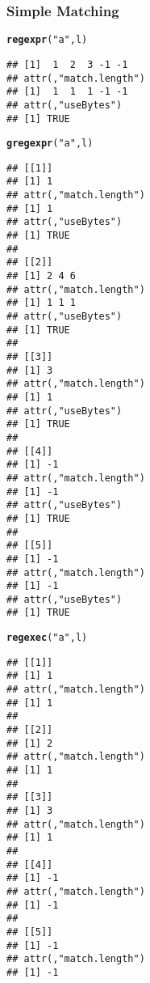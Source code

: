 \documentclass[paper=screen,mathserif]{beamer}\usepackage[]{graphicx}\usepackage[]{color}
\makeatletter
\newcommand{\hlstr}[1]{\textcolor[rgb]{0.192,0.494,0.8}{#1}}%
\newcommand{\hlstd}[1]{\textcolor[rgb]{0.345,0.345,0.345}{#1}}%
\newcommand{\hlkwd}[1]{\textcolor[rgb]{0.737,0.353,0.396}{\textbf{#1}}}%
\newenvironment{kframe}{%
 \def\at@end@of@kframe{}%
 \ifinner\ifhmode%
  \def\at@end@of@kframe{\end{minipage}}%
  \begin{minipage}{\columnwidth}%
 \fi\fi%
 \def\FrameCommand##1{\hskip\@totalleftmargin \hskip-\fboxsep
 \colorbox{shadecolor}{##1}\hskip-\fboxsep
     \hskip-\linewidth \hskip-\@totalleftmargin \hskip\columnwidth}%
 \MakeFramed {\advance\hsize-\width
   \@totalleftmargin\z@ \linewidth\hsize
   \@setminipage}}%
 {\par\unskip\endMakeFramed%
 \at@end@of@kframe}
\newenvironment{knitrout}{}{} %
\newcommand{\ft}[1]{\frametitle{#1}}
\newenvironment{xframe}[1][]
{\begin{frame}[fragile,environment=xframe]
    \frametitle{#1}}
  {\end{frame}}
\makeatother
\begin{document}
\begin{xframe}
  \ft{Simple Matching}

\begin{knitrout}\tiny
{}\color{fgcolor}\begin{kframe}
\begin{alltt}
\hlkwd{regexpr}\hlstd{(}\hlstr{"a"}\hlstd{, l)}
\end{alltt}
\begin{verbatim}
## [1]  1  2  3 -1 -1
## attr(,"match.length")
## [1]  1  1  1 -1 -1
## attr(,"useBytes")
## [1] TRUE
\end{verbatim}
\begin{alltt}
\hlkwd{gregexpr}\hlstd{(}\hlstr{"a"}\hlstd{, l)}
\end{alltt}
\begin{verbatim}
## [[1]]
## [1] 1
## attr(,"match.length")
## [1] 1
## attr(,"useBytes")
## [1] TRUE
## 
## [[2]]
## [1] 2 4 6
## attr(,"match.length")
## [1] 1 1 1
## attr(,"useBytes")
## [1] TRUE
## 
## [[3]]
## [1] 3
## attr(,"match.length")
## [1] 1
## attr(,"useBytes")
## [1] TRUE
## 
## [[4]]
## [1] -1
## attr(,"match.length")
## [1] -1
## attr(,"useBytes")
## [1] TRUE
## 
## [[5]]
## [1] -1
## attr(,"match.length")
## [1] -1
## attr(,"useBytes")
## [1] TRUE
\end{verbatim}
\begin{alltt}
\hlkwd{regexec}\hlstd{(}\hlstr{"a"}\hlstd{, l)}
\end{alltt}
\begin{verbatim}
## [[1]]
## [1] 1
## attr(,"match.length")
## [1] 1
## 
## [[2]]
## [1] 2
## attr(,"match.length")
## [1] 1
## 
## [[3]]
## [1] 3
## attr(,"match.length")
## [1] 1
## 
## [[4]]
## [1] -1
## attr(,"match.length")
## [1] -1
## 
## [[5]]
## [1] -1
## attr(,"match.length")
## [1] -1
\end{verbatim}
\end{kframe}
\end{knitrout}

\end{xframe}
\end{document}
